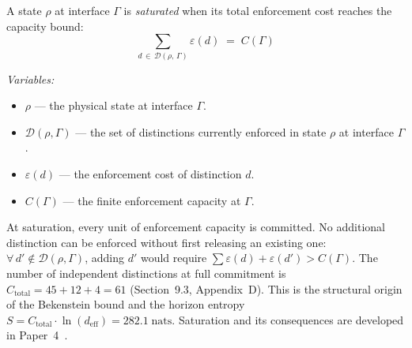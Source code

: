 \documentclass[11pt]{article}
\newcommand{\nats}{\;\mathrm{nats}}
\begin{document}
\begin{tcolorbox}[apfbox, title={Definition (Saturation)}]
A state $\rho$ at interface $\Gamma$ is \emph{saturated} when its total enforcement cost reaches the capacity bound:
\begin{equation}
\sum_{d \,\in\, \mathcal{D}(\rho,\,\Gamma)} \varepsilon(d) \;=\; C(\Gamma)
\end{equation}

\smallskip\noindent\textit{Variables:}
\begin{itemize}[nosep,leftmargin=2em]
\item $\rho$ --- the physical state at interface $\Gamma$.
\item $\mathcal{D}(\rho, \Gamma)$ --- the set of distinctions currently enforced in state $\rho$ at interface $\Gamma$.
\item $\varepsilon(d)$ --- the enforcement cost of distinction $d$.
\item $C(\Gamma)$ --- the finite enforcement capacity at $\Gamma$.
\end{itemize}

\smallskip\noindent
At saturation, every unit of enforcement capacity is committed.  No additional distinction can be enforced without first releasing an existing one: $\forall\, d' \notin \mathcal{D}(\rho,\Gamma)$, adding $d'$ would require $\sum \varepsilon(d) + \varepsilon(d') > C(\Gamma)$.  The number of independent distinctions at full commitment is $C_{\mathrm{total}} = 45 + 12 + 4 = 61$ (Section~9.3, Appendix~D).  This is the structural origin of the Bekenstein bound and the horizon entropy $S = C_{\mathrm{total}} \cdot \ln(d_{\mathrm{eff}}) = 282.1\nats$.  Saturation and its consequences are developed in Paper~4~\cite{P4}.
\end{tcolorbox}
\end{document}
